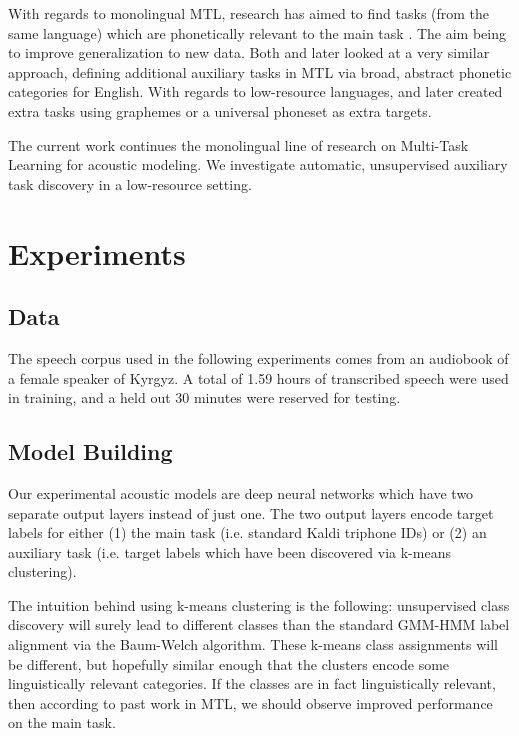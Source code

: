 \documentclass[a4paper]{article}
\begin{document}
With regards to monolingual MTL, research has aimed to find tasks (from the same language) which are phonetically relevant to the main task \cite{bell2015}. The aim being to improve generalization to new data. Both \cite{seltzer2013} and later \cite{huang2015} looked at a very similar approach, defining additional auxiliary tasks in MTL via broad, abstract phonetic categories for English. With regards to low-resource languages, \cite{chen2014} and later \cite{chen2015} created extra tasks using graphemes or a universal phoneset as extra targets.

The current work continues the monolingual line of research on Multi-Task Learning for acoustic modeling. We investigate automatic, unsupervised auxiliary task discovery in a low-resource setting.


\section{Experiments}


\subsection{Data}

The speech corpus used in the following experiments comes from an audiobook of a female speaker of Kyrgyz. A total of 1.59 hours of transcribed speech were used in training, and a held out 30 minutes were reserved for testing.


\subsection{Model Building}

Our experimental acoustic models are deep neural networks which have two separate output layers instead of just one. The two output layers encode target labels for either (1) the main task (i.e. standard Kaldi triphone IDs) or (2) an auxiliary task (i.e. target labels which have been discovered via k-means clustering).

The intuition behind using k-means clustering is the following: unsupervised class discovery will surely lead to different classes than the standard GMM-HMM label alignment via the Baum-Welch algorithm. These k-means class assignments will be different, but hopefully similar enough that the clusters encode some linguistically relevant categories. If the classes are in fact linguistically relevant, then according to past work in MTL, we should observe improved performance on the main task.
\end{document}
